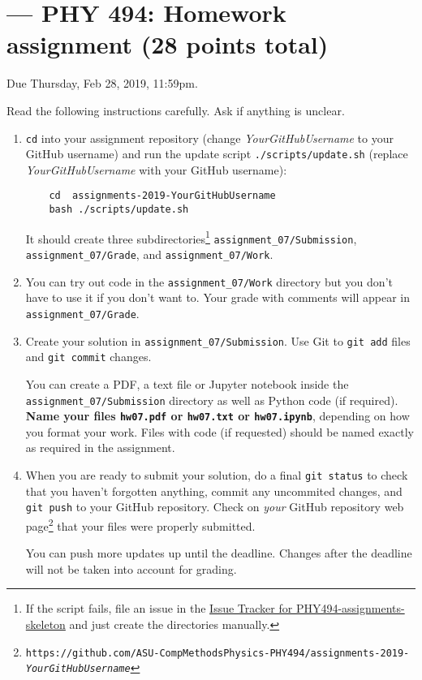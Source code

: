 \documentclass[paper=letter]{scrartcl}
\newcommand{\anumber}{7}
\newcommand{\anum}{0\anumber}
\begin{document}

\setcounter{section}{\anumber}
\addtocounter{section}{-1}
\section{ --- PHY 494: Homework assignment (28 points total)}

\noindent Due Thursday, Feb 28, 2019, 11:59pm.

\noindent
Read the following instructions carefully. Ask if anything is unclear.
\begin{enumerate}
\item \texttt{cd} into your assignment repository (change
  \emph{YourGitHubUsername} to your GitHub username) and run the
  update script \texttt{./scripts/update.sh} (replace
  \emph{YourGitHubUsername} with your GitHub username):
  \begin{verbatim}
    cd  assignments-2019-YourGitHubUsername
    bash ./scripts/update.sh
  \end{verbatim}
  It should create three subdirectories\footnote{If the script fails,
    file an issue in the
    \href{https://github.com/ASU-CompMethodsPhysics-PHY494/PHY494-assignments-skeleton/issues}{Issue
      Tracker for PHY494-assignments-skeleton} and just create the
    directories manually.} \texttt{assignment\_\anum/Submission},
  \texttt{assignment\_\anum/Grade}, and
  \texttt{assignment\_\anum/Work}.
\item You can try out code in the \texttt{assignment\_\anum/Work}
  directory but you don't have to use it if you don't want to. Your
  grade with comments will appear in
  \texttt{assignment\_\anum/Grade}.
\item Create your solution in
  \texttt{assignment\_\anum/Submission}. Use Git to \texttt{git
    add} files and \texttt{git commit} changes.

  You can create a PDF, a text file or Jupyter notebook inside the
  \texttt{assignment\_\anum/Submission} directory as well as Python
  code (if required). \textbf{Name your files \texttt{hw\anum.pdf} or
    \texttt{hw\anum.txt} or \texttt{hw\anum.ipynb}}, depending on how
  you format your work. Files with code (if requested) should be named
  exactly as required in the assignment.
\item When you are ready to submit your solution, do a final
  \texttt{git status} to check that you haven't forgotten anything,
  commit any uncommited changes, and \texttt{git push} to your GitHub
  repository. Check on \emph{your} GitHub repository web
  page\footnote{\texttt{https://github.com/ASU-CompMethodsPhysics-PHY494/assignments-2019-\emph{YourGitHubUsername}}}
  that your files were properly submitted.

  You can push more updates up until the deadline. Changes after the
  deadline will not be taken into account for grading.
\end{enumerate}
\end{document}
